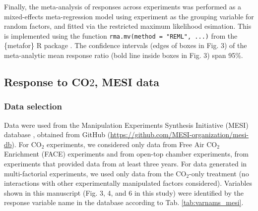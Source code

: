 \documentclass{myreport}
\begin{document}
Finally, the meta-analysis of responses across experiments was performed as a mixed-effects meta-regression model using experiment as the grouping variable for random factors, and fitted via the restricted maximum likelihood esimation. This is implemented using the function \texttt{rma.mv(method = "REML", ...)} from the \{metafor\} R package \citep{viechtbauer_conducting_2010}. The confidence intervals (edges of boxes in Fig. 3) of the meta-analytic mean response ratio (bold line inside boxes in Fig. 3) span 95\%. 


\subsection{Response to CO$2$, MESI data}

\subsubsection{Data selection}

Data were used from the Manipulation Experiments Synthesis Initiative (MESI) database \citep{vansundert_when_2023}, obtained from GitHub (\url{https://github.com/MESI-organization/mesi-db}). For CO$_2$ experiments, we considered only data from Free Air CO$_2$ Enrichment (FACE) experiments and from open-top chamber experiments, from experiments that provided data from at least three years. For data generated in multi-factorial experiments, we used only data from the CO$_2$-only treatment (no interactions with other experimentally manipulated factors considered). Variables shown in this manuscript (Fig. 3, 4, and 6 in this study) were identified by the response variable name in the database according to Tab. \ref{tab:varnams_mesi}.
\end{document}
